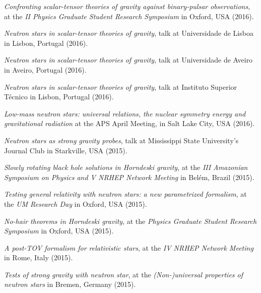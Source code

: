 \documentclass[10pt]{article}
\newcommand{\invited}{{\color{aeilbl}{invited}}}
\begin{document}
\begin{bibenum}
    \item
    \emph{Confronting scalar-tensor theories of gravity
    against binary-pulsar observations},
    at the \emph{II Physics Graduate Student Research Symposium}
    in Oxford, USA (2016).

    \item
    \emph{Neutron stars in scalar-tensor theories of gravity},
    \invited{} talk at Universidade de Lisboa
    in Lisbon, Portugal (2016).

    \item
    \emph{Neutron stars in scalar-tensor theories of gravity},
    \invited{} talk at Universidade de Aveiro
    in Aveiro, Portugal (2016).

    \item
    \emph{Neutron stars in scalar-tensor theories of gravity},
    \invited{} talk at Instituto Superior T\'ecnico
    in Lisbon, Portugal (2016).

    \item
    \emph{Low-mass neutron stars: universal relations, the nuclear symmetry energy and gravitational radiation}
    at the {APS April Meeting},
    in Salt Lake City, USA (2016).

    \item
    \emph{Neutron stars as strong gravity probes},
    \invited{} talk at Mississippi State University's Journal Club
    in Starkville, USA (2015).

    \item
    \emph{Slowly rotating black hole solutions in Horndeski gravity},
    at the \emph{III Amazonian Symposium on Physics and V NRHEP Network Meeting}
    in Bel\'em, Brazil (2015).

    \item
    \emph{Testing general relativity with neutron stars: a new
    parametrized formalism},
    at the \emph{UM Research Day}
    in Oxford, USA (2015).

    \item
    \emph{No-hair theorems in Horndeski gravity},
    at the \emph{Physics Graduate Student Research Symposium}
    in Oxford, USA (2015).

    \item
    \emph{A post-TOV formalism for relativistic stars},
    at the \emph{IV NRHEP Network Meeting}
    in Rome, Italy (2015).

    \item
    \emph{Tests of strong gravity with neutron star},
    at the \emph{(Non-)universal properties of neutron stars}
    in Bremen, Germany (2015).


\end{bibenum}
\end{document}
